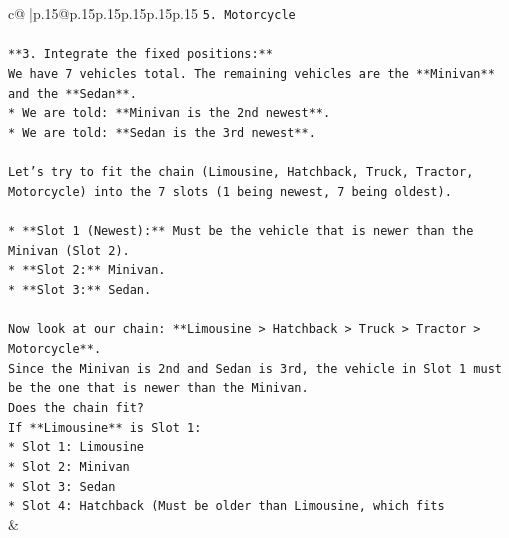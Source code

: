\documentclass{article}
\begin{document}
{\begin{supertabular}{c@{$\;$}|p{.15\linewidth}@{}p{.15\linewidth}p{.15\linewidth}p{.15\linewidth}p{.15\linewidth}p{.15\linewidth}}
{{{\texttt{5.  Motorcycle} \\
\\ 
\texttt{**3. Integrate the fixed positions:**} \\
\texttt{We have 7 vehicles total. The remaining vehicles are the **Minivan** and the **Sedan**.} \\
\texttt{*   We are told: **Minivan is the 2nd newest**.} \\
\texttt{*   We are told: **Sedan is the 3rd newest**.} \\
\\ 
\texttt{Let's try to fit the chain (Limousine, Hatchback, Truck, Tractor, Motorcycle) into the 7 slots (1 being newest, 7 being oldest).} \\
\\ 
\texttt{*   **Slot 1 (Newest):** Must be the vehicle that is newer than the Minivan (Slot 2).} \\
\texttt{*   **Slot 2:** Minivan.} \\
\texttt{*   **Slot 3:** Sedan.} \\
\\ 
\texttt{Now look at our chain: **Limousine > Hatchback > Truck > Tractor > Motorcycle**.} \\
\texttt{Since the Minivan is 2nd and Sedan is 3rd, the vehicle in Slot 1 must be the one that is newer than the Minivan.} \\
\texttt{Does the chain fit?} \\
\texttt{If **Limousine** is Slot 1:} \\
\texttt{*   Slot 1: Limousine} \\
\texttt{*   Slot 2: Minivan} \\
\texttt{*   Slot 3: Sedan} \\
\texttt{*   Slot 4: Hatchback (Must be older than Limousine, which fits} \\
            }
        }
    }
    & \\ \\


\end{supertabular}}
\end{document}
